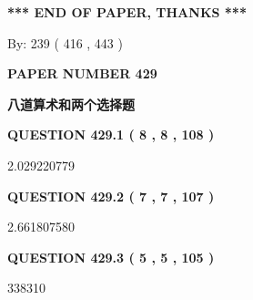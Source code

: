 \documentclass{ctexart}
\begin{document}
   
   
   
   
\vspace{1.0in} 
{\textbf{\large{ *** END OF PAPER, THANKS *** }}} 
   
   
\hspace{1.0in} By: 
 239 ( 416 ,  443 )
   
   
   
   
\newpage 
\setcounter{page}{ 
   429001 } 
   
   
   
   
 {\textbf{ \Large{ PAPER NUMBER  429  }}}
   
   
\vspace{0.2in}
   
   
   
   
   
   
 \vspace{0.2in}
{\LARGE {\textbf{ 八道算术和两个选择题}}}
   
   
  
\vspace{0.2in}
  
{\textbf{\Large{QUESTION
429.1 
 ( 8 , 8 , 108 )
}}}
  
  
 
 
\noindent{}

2.029220779
 
 
  
\vspace{0.2in}
  
{\textbf{\Large{QUESTION
429.2 
 ( 7 , 7 , 107 )
}}}
  
  
 
 
\noindent{}

2.661807580
 
 
  
\vspace{0.2in}
  
{\textbf{\Large{QUESTION
429.3 
 ( 5 , 5 , 105 )
}}}
  
  
 
 
\noindent{}

338310
 
 
  
\vspace{0.2in}
  
\end{document}
